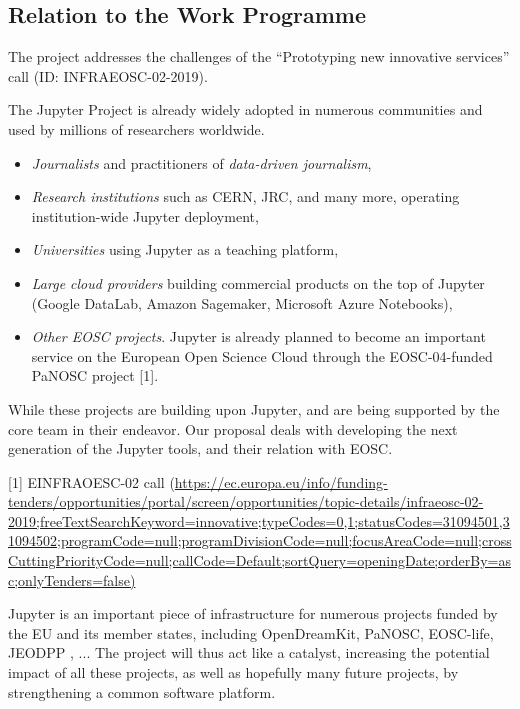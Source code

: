 \subsection{Relation to the Work Programme}

The \TheProject project addresses the challenges of the ``Prototyping
new innovative services'' call (ID: INFRAEOSC-02-2019).





The Jupyter Project is already widely adopted in numerous communities
and used by millions of researchers worldwide.

\begin{itemize}
\item \emph{Journalists} and practitioners of \emph{data-driven
    journalism},
\item \emph{Research institutions} such as CERN, JRC, and many more,
  operating institution-wide Jupyter deployment,
\item \emph{Universities} using Jupyter as a teaching platform,
\item \emph{Large cloud providers} building commercial products on the
  top of Jupyter (Google DataLab, Amazon Sagemaker, Microsoft Azure
  Notebooks),
\item \emph{Other EOSC projects}. Jupyter is already planned to become
  an important service on the European Open Science Cloud through the
  EOSC-04-funded PaNOSC project [1].
\end{itemize}

While these projects are building upon Jupyter, and are being
supported by the core team in their endeavor. Our proposal deals with
developing the next generation of the Jupyter tools, and their
relation with EOSC.

[1] EINFRAOESC-02 call (\url{https://ec.europa.eu/info/funding-tenders/opportunities/portal/screen/opportunities/topic-details/infraeosc-02-2019;freeTextSearchKeyword=innovative;typeCodes=0,1;statusCodes=31094501,31094502;programCode=null;programDivisionCode=null;focusAreaCode=null;crossCuttingPriorityCode=null;callCode=Default;sortQuery=openingDate;orderBy=asc;onlyTenders=false)}

Jupyter is an important piece of infrastructure for numerous projects funded
by the EU and its member states, including OpenDreamKit, PaNOSC, EOSC-life,
JEODPP \cite{Soille2018}, ... The \TheProject project
will thus act like a catalyst, increasing the potential impact of all these
projects, as well as hopefully many future projects, by strengthening a common
software platform.

